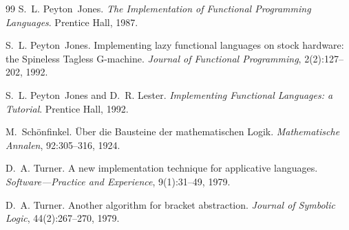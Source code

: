 \documentclass[11pt,a4paper]{article}
\theoremstyle{definition}
\theoremstyle{plain}
\begin{document}
\begin{thebibliography}{99}
S.~L. Peyton~Jones.
\newblock \emph{The Implementation of Functional Programming Languages}.
\newblock Prentice Hall, 1987.

S.~L. Peyton~Jones.
\newblock Implementing lazy functional languages on stock hardware: the
  {S}pineless {T}agless {G}-machine.
\newblock \emph{Journal of Functional Programming}, 2(2):127--202, 1992.

S.~L. Peyton~Jones and D.~R. Lester.
\newblock \emph{Implementing Functional Languages: a Tutorial}.
\newblock Prentice Hall, 1992.

M.~Schönfinkel.
\newblock Über die {B}austeine der mathematischen {L}ogik.
\newblock \emph{Mathematische Annalen}, 92:305--316, 1924.

D.~A. Turner.
\newblock A new implementation technique for applicative languages.
\newblock \emph{Software---Practice and Experience}, 9(1):31--49, 1979.

D.~A. Turner.
\newblock Another algorithm for bracket abstraction.
\newblock \emph{Journal of Symbolic Logic}, 44(2):267--270, 1979.

\end{thebibliography}
\end{document}
